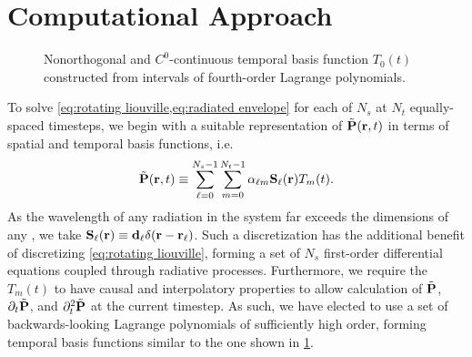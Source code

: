 \section{Computational Approach}
\begin{figure}
  
  \caption{\label{fig:interpolation basis} Nonorthogonal and $C^0$-continuous temporal basis function $T_0(t)$ constructed from intervals of fourth-order Lagrange polynomials.}
\end{figure}
To solve \cref{eq:rotating liouville,eq:radiated envelope} for each of $N_s$ \qds{} at $N_t$ equally-spaced timesteps, we begin with a suitable representation of $\tilde{\vb{P}}(\vb{r}, t)$ in terms of spatial and temporal basis functions, i.e.~
\begin{equation}
  \tilde{\vb{P}}(\vb{r}, t) \equiv \sum_{\ell=0}^{N_s - 1} \sum_{m = 0}^{N_t - 1} \alpha_{\ell m} \vb{S}_\ell(\vb{r}) T_m(t).
  \label{eq:basis function representation}
\end{equation}
As the wavelength of any radiation in the system far exceeds the dimensions of any \qd{}, we take $\vb{S}_\ell(\vb{r}) \equiv \vb{d}_\ell \delta(\vb{r} - \vb{r}_\ell)$.
Such a discretization has the additional benefit of discretizing \cref{eq:rotating liouville}, forming a set of $N_s$ first-order differential equations coupled through radiative processes.
Furthermore, we require the $T_m(t)$ to have causal and interpolatory properties to allow calculation of $\tilde{\vb{P}}$, $\partial_t \tilde{\vb{P}}$, and $\partial^2_t \tilde{\vb{P}}$ at the current timestep. 
As such, we have elected to use a set of backwards-looking Lagrange polynomials of sufficiently high order, forming temporal basis functions similar to the one shown in \cref{fig:interpolation basis}.

